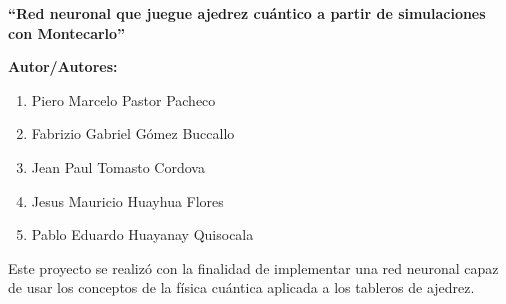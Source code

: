 
\begin{center}
    \textbf{\textcolor{pucpVerde}{\huge ``Red neuronal que juegue ajedrez cuántico a partir de simulaciones con Montecarlo''}}
\end{center}


\textcolor{pucpVerde}{\textbf{Autor/Autores:}}

\begin{center}
	\begin{minipage}{0.75\textwidth}
		\begin{enumerate}
			\item Piero Marcelo Pastor Pacheco
			\item Fabrizio Gabriel Gómez  Buccallo 
			\item Jean Paul Tomasto Cordova 
			\item Jesus Mauricio Huayhua Flores 
			\item Pablo Eduardo Huayanay Quisocala 
		\end{enumerate}
	\end{minipage}
\end{center}



\begin{center}
\begin{minipage}{0.85\textwidth}
\noindent
Este proyecto se realizó con la finalidad de implementar una red neuronal capaz de usar los conceptos de la física cuántica aplicada a los tableros de ajedrez.
\end{minipage}
\end{center}


